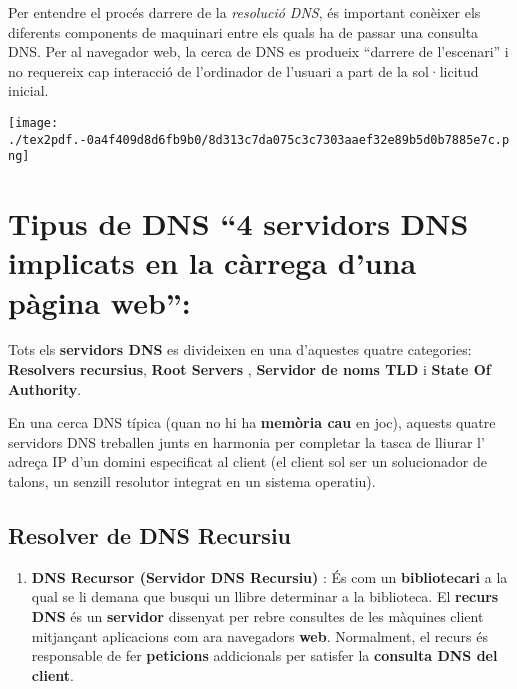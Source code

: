 \documentclass[]{article}
\providecommand{\tightlist}{%
  \setlength{\itemsep}{0pt}\setlength{\parskip}{0pt}}
\begin{document}
Per entendre el procés darrere de la \emph{resolució DNS}, és important
conèixer els diferents components de maquinari entre els quals ha de
passar una consulta DNS. Per al navegador web, la cerca de DNS es
produeix ``darrere de l'escenari'' i no requereix cap interacció de
l'ordinador de l'usuari a part de la sol·licitud inicial.

\texttt{[image: ./tex2pdf.-0a4f409d8d6fb9b0/8d313c7da075c3c7303aaef32e89b5d0b7885e7c.png]}

\hypertarget{tipus-de-dns-4-servidors-dns-implicats-en-la-cuxe0rrega-duna-puxe0gina-web}{%
\section{\texorpdfstring{\textbf{Tipus de DNS ``4 servidors DNS
implicats en la càrrega d'una pàgina
web'':}}{Tipus de DNS ``4 servidors DNS implicats en la càrrega d'una pàgina web'':}}\label{tipus-de-dns-4-servidors-dns-implicats-en-la-cuxe0rrega-duna-puxe0gina-web}}

Tots els \textbf{servidors DNS} es divideixen en una d'aquestes quatre
categories: \textbf{Resolvers recursius}, \textbf{Root Servers} ,
\textbf{Servidor de noms TLD} i \textbf{State Of Authority}.

En una cerca DNS típica (quan no hi ha \textbf{memòria cau} en joc),
aquests quatre servidors DNS treballen junts en harmonia per completar
la tasca de lliurar l' adreça IP d'un domini especificat al client (el
client sol ser un solucionador de talons, un senzill resolutor integrat
en un sistema operatiu).

\hypertarget{resolver-de-dns-recursiu}{%
\subsection{\texorpdfstring{\textbf{Resolver de DNS
Recursiu}}{Resolver de DNS Recursiu}}\label{resolver-de-dns-recursiu}}

\begin{enumerate}
\def\labelenumi{\arabic{enumi}.}
\tightlist
\item
  \textbf{DNS Recursor (Servidor DNS Recursiu)} : És com un
  \textbf{bibliotecari} a la qual se li demana que busqui un llibre
  determinar a la biblioteca. El \textbf{recurs DNS} és un
  \textbf{servidor} dissenyat per rebre consultes de les màquines client
  mitjançant aplicacions com ara navegadors \textbf{web}. Normalment, el
  recurs és responsable de fer \textbf{peticions} addicionals per
  satisfer la \textbf{consulta DNS del client}.
\end{enumerate}
\end{document}
